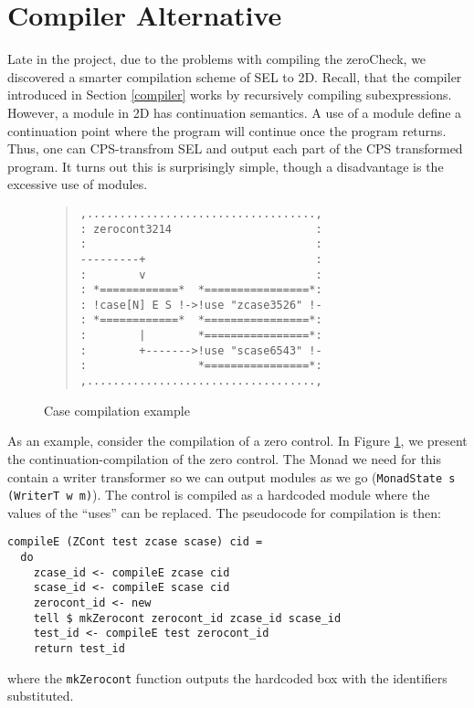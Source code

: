 \section{Compiler Alternative}
\label{chap:compiler-alter}

Late in the project, due to the problems with compiling the zeroCheck,
we discovered a smarter compilation scheme of SEL to 2D. Recall, that
the compiler introduced in Section \ref{compiler} works by recursively
compiling subexpressions. However, a module in 2D has continuation
semantics. A use of a module define a continuation point where the
program will continue once the program returns. Thus, one can
CPS-transfrom SEL and output each part of the CPS transformed
program. It turns out this is surprisingly simple, though a
disadvantage is the excessive use of modules.

\begin{figure}
  \begin{quote}
\begin{verbatim}
,...................................,
: zerocont3214                      :
:                                   :
---------+                          :
:        v                          :
: *============*  *================*:
: !case[N] E S !->!use "zcase3526" !-
: *============*  *================*:
:      	 |        *================*:
:        +------->!use "scase6543" !-
:                 *================*:
,...................................,
\end{verbatim}
  \end{quote}
  \caption{Case compilation example}
  \label{fig:2}
\end{figure}

As an example, consider the compilation of a zero control. In Figure
\ref{fig:2}, we present the continuation-compilation of the zero
control. The Monad we need for this contain a writer transformer so we
can output modules as we go (\texttt{MonadState s (WriterT w m)}). The
control is compiled as a hardcoded module where the values of the
``uses'' can be replaced. The pseudocode for compilation is then:

\begin{samepage}
\begin{verbatim}
compileE (ZCont test zcase scase) cid =
  do
    zcase_id <- compileE zcase cid
    scase_id <- compileE scase cid
    zerocont_id <- new
    tell $ mkZerocont zerocont_id zcase_id scase_id
    test_id <- compileE test zerocont_id
    return test_id
\end{verbatim}
\end{samepage}
where the \texttt{mkZerocont} function outputs the hardcoded box with
the identifiers substituted.

